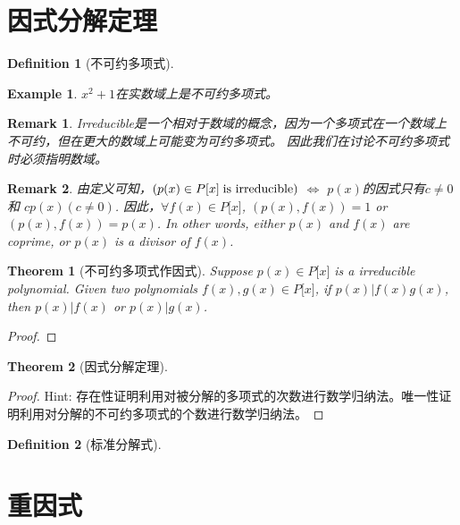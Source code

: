 \documentclass[onecolumn]{ctexart}
\newtheorem{definition}{Definition}
\newtheorem{theorem}{Theorem}
\newtheorem{remark}{Remark}
\newtheorem{example}{Example}
\begin{document}
\section{因式分解定理}
\begin{definition}[不可约多项式]
  
\end{definition}
\begin{example}
  $x^2 + 1$在实数域上是不可约多项式。
\end{example}
\begin{remark}
  Irreducible是一个相对于数域的概念，因为一个多项式在一个数域上不可约，但在更大的数域上可能变为可约多项式。
  因此我们在讨论不可约多项式时必须指明数域。
\end{remark}
\begin{remark}
  由定义可知，$(p(x) \in P\lbrack x \rbrack \thickspace \textnormal{is irreducible})$ $\Leftrightarrow$ $p(x)$的因式只有$c \neq 0$和
  $c p(x) (c \neq 0)$. 因此，$\forall f(x) \in P\lbrack x \rbrack$, $(p(x), f(x)) = 1$ or 
  $(p(x), f(x)) = p(x)$. In other words, either $p(x)$ and $f(x)$ are coprime, or $p(x)$ 
  is a divisor of $f(x)$.
\end{remark}

\begin{theorem}[不可约多项式作因式]
  Suppose $p(x) \in P\lbrack x \rbrack$ is a irreducible polynomial. Given two 
  polynomials $f(x), g(x) \in P\lbrack x \rbrack$, if $p(x) | f(x)g(x)$, then 
  $p(x) | f(x)$ or $p(x) | g(x)$.
\end{theorem}
\begin{proof}
  
\end{proof}

\begin{theorem}[因式分解定理]
  
\end{theorem}
\begin{proof}
  Hint: 存在性证明利用对被分解的多项式的次数进行数学归纳法。唯一性证明利用对分解的不可约多项式的个数进行数学归纳法。
\end{proof}

\begin{definition}[标准分解式]
  
\end{definition}

\section{重因式}
\end{document}
